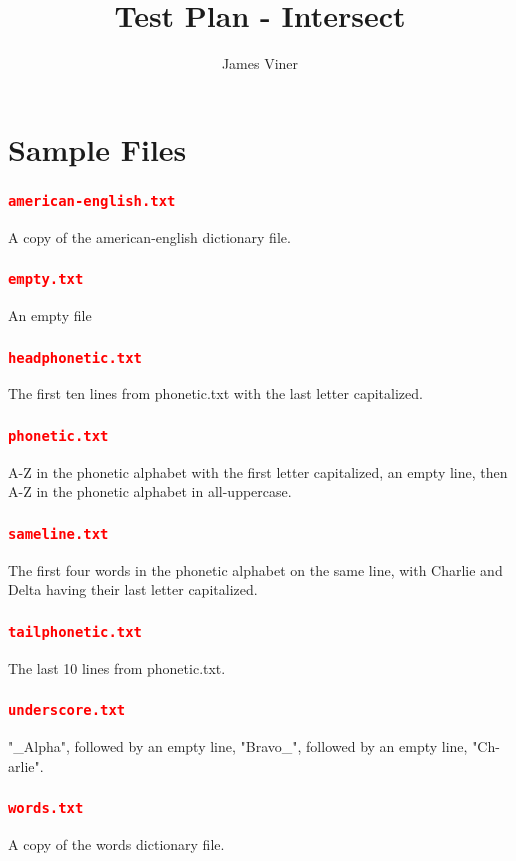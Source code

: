 \documentclass[11pt]{report}
\begin{document}
\title{Test Plan - Intersect}
\author{James Viner}
\date{} %
\maketitle

\doublespacing

\pagebreak
\section*{Sample Files}
\subsubsection*{\texttt{\textcolor{red}{american-english.txt}}}
A copy of the american-english dictionary file.
\subsubsection*{\texttt{\textcolor{red}{empty.txt}}}
An empty file
\subsubsection*{\texttt{\textcolor{red}{headphonetic.txt}}}
The first ten lines from phonetic.txt with the last letter capitalized.
\subsubsection*{\texttt{\textcolor{red}{phonetic.txt}}}
A-Z in the phonetic alphabet with the first letter capitalized, an empty line, then A-Z in the phonetic alphabet in all-uppercase.
\subsubsection*{\texttt{\textcolor{red}{sameline.txt}}}
The first four words in the phonetic alphabet on the same line, with Charlie and Delta having their last letter capitalized.
\subsubsection*{\texttt{\textcolor{red}{tailphonetic.txt}}}
The last 10 lines from phonetic.txt.
\subsubsection*{\texttt{\textcolor{red}{underscore.txt}}}
"\_Alpha", followed by an empty line, "Bravo\_", followed by an empty line, "Ch-arlie".
\subsubsection*{\texttt{\textcolor{red}{words.txt}}}
A copy of the words dictionary file.
\pagebreak
\end{document}
